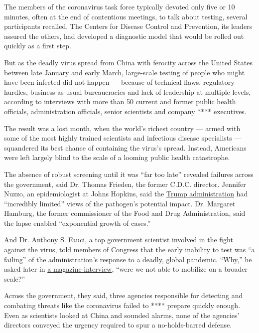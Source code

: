 The members of the coronavirus task force typically devoted only five or
10 minutes, often at the end of contentious meetings, to talk about
testing, several participants recalled. The Centers for Disease Control
and Prevention, its leaders assured the others, had developed a
diagnostic model that would be rolled out quickly as a first step.

But as the deadly virus spread from China with ferocity across the
United States between late January and early March, large-scale testing
of people who might have been infected did not happen --- because of
technical flaws, regulatory hurdles, business-as-usual bureaucracies and
lack of leadership at multiple levels, according to interviews with more
than 50 current and former public health officials, administration
officials, senior scientists and company **** executives.

The result was a lost month, when the world's richest country --- armed
with some of the most highly trained scientists and infectious disease
specialists --- squandered its best chance of containing the virus's
spread. Instead, Americans were left largely blind to the scale of a
looming public health catastrophe.

The absence of robust screening until it was ``far too late'' revealed
failures across the government, said Dr. Thomas Frieden, the former
C.D.C. director. Jennifer Nuzzo, an epidemiologist at Johns Hopkins,
said the
\href{https://www.nytimes3xbfgragh.onion/2020/04/01/us/politics/coronavirus-trump.html}{Trump
administration} had ``incredibly limited'' views of the pathogen's
potential impact. Dr. Margaret Hamburg, the former commissioner of the
Food and Drug Administration, said the lapse enabled ``exponential
growth of cases.''

And Dr. Anthony S. Fauci, a top government scientist involved in the
fight against the virus, told members of Congress that the early
inability to test was ``a failing'' of the administration's response to
a deadly, global pandemic. ``Why,'' he asked later in
\href{https://www.sciencemag.org/news/2020/03/i-m-going-keep-pushing-anthony-fauci-tries-make-white-house-listen-facts-pandemic}{a
magazine interview}, ``were we not able to mobilize on a broader
scale?''

Across the government, they said, three agencies responsible for
detecting and combating threats like the coronavirus failed to ****
prepare quickly enough. Even as scientists looked at China and sounded
alarms, none of the agencies' directors conveyed the urgency required to
spur a no-holds-barred defense.

